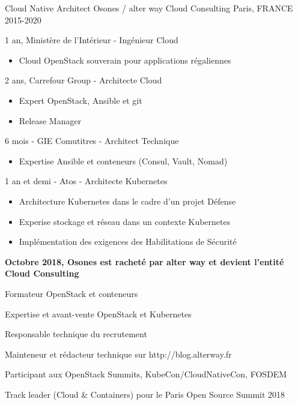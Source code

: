\begin{cventries}
  \cventry
    {Cloud Native Architect} %
    {Osones / alter way Cloud Consulting} %
    {Paris, FRANCE} %
    {2015-2020} %
    {
      \begin{cvitems} %
      \item {1 an, Ministère de l'Intérieur - Ingénieur Cloud}
          \begin{itemize}
            \item {Cloud OpenStack souverain pour applications régaliennes}
          \end{itemize}
        \item {2 ans, Carrefour Group - Architecte Cloud}
          \begin{itemize}
            \item {Expert OpenStack, Ansible et git}
            \item {Release Manager}
          \end{itemize}
        \item {6 mois - GIE Comutitres - Architect Technique}
          \begin{itemize}
            \item {Expertise Ansible et conteneurs (Consul, Vault, Nomad)}
          \end{itemize}
        \item {1 an et demi - Atos - Architecte Kubernetes}
        \begin{itemize}
          \item {Architecture Kubernetes dans le cadre d'un projet Défense}
          \item {Experise stockage et réseau dans un contexte Kubernetes}
          \item {Implémentation des exigences des Habilitations de Sécurité}
          \end{itemize}
        \item {\textbf{Octobre 2018, Osones est racheté par alter way et devient
        l'entité Cloud Consulting}}
        \item {Formateur OpenStack et conteneurs}
        \item {Expertise et avant-vente OpenStack et Kubernetes}
        \item {Responsable technique du recrutement}
        \item {Mainteneur et rédacteur technique sur http://blog.alterway.fr}
        \item {Participant aux OpenStack Summits, KubeCon/CloudNativeCon, FOSDEM}
        \item {Track leader (Cloud \& Containers) pour le Paris Open Source Summit
        2018}
      \end{cvitems}
    }


\end{cventries}
